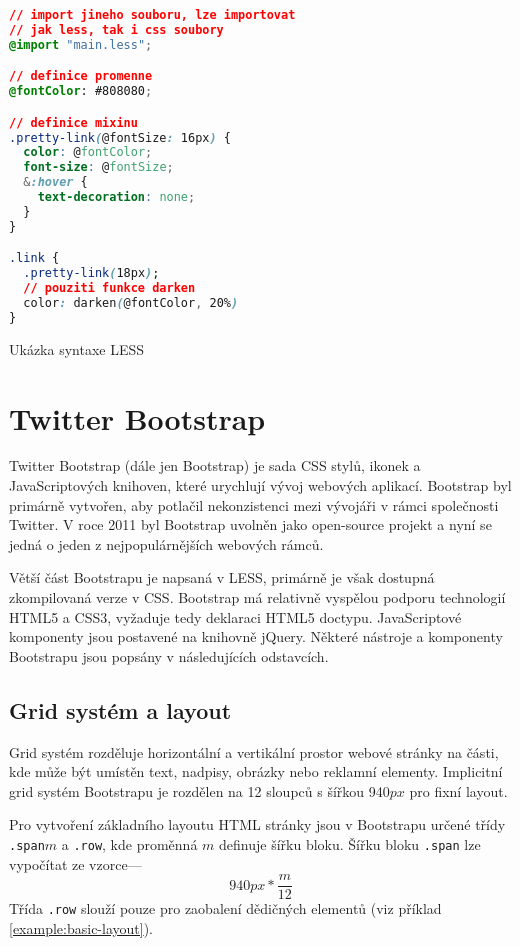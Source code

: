 \begin{example}
    \centering
    \begin{lstlisting}[language=css]
// import jineho souboru, lze importovat
// jak less, tak i css soubory
@import "main.less";

// definice promenne
@fontColor: #808080;

// definice mixinu
.pretty-link(@fontSize: 16px) {
  color: @fontColor;
  font-size: @fontSize;
  &:hover {
    text-decoration: none;
  }
}

.link {
  .pretty-link(18px);
  // pouziti funkce darken
  color: darken(@fontColor, 20%)
}
    \end{lstlisting}
    \caption{Ukázka syntaxe LESS}
    \label{example:less-css}
\end{example}

\section{Twitter Bootstrap}
\label{sec:bootstrap}

Twitter Bootstrap (dále jen Bootstrap) je sada CSS stylů, ikonek a JavaScriptových knihoven, které urychlují vývoj webových aplikací. Bootstrap byl primárně vytvořen, aby potlačil nekonzistenci mezi vývojáři v rámci společnosti Twitter. V roce 2011 byl Bootstrap uvolněn jako open-source projekt a nyní se jedná o jeden z nejpopulárnějších webových rámců.

Větší část Bootstrapu je napsaná v LESS, primárně je však dostupná zkompilovaná verze v CSS. Bootstrap má relativně vyspělou podporu technologií HTML5 a CSS3, vyžaduje tedy deklaraci HTML5 doctypu. JavaScriptové komponenty jsou postavené na knihovně jQuery\footnotemark[2]. Některé nástroje a komponenty Bootstrapu jsou popsány v následujících odstavcích.


\subsection{Grid systém a layout}

Grid systém rozděluje horizontální a vertikální prostor webové stránky na části, kde může být umístěn text, nadpisy, obrázky nebo reklamní elementy. Implicitní grid systém Bootstrapu je rozdělen na 12 sloupců s šířkou 940$px$ pro fixní layout.

Pro vytvoření základního layoutu HTML stránky jsou v Bootstrapu určené třídy \texttt{.span}$m$ a \texttt{.row}, kde proměnná $m$ definuje šířku bloku. Šířku bloku \texttt{.span} lze vypočítat ze vzorce---
$$940px * \frac{m}{12}$$
Třída \texttt{.row} slouží pouze pro zaobalení dědičných elementů (viz příklad \ref{example:basic-layout}).

